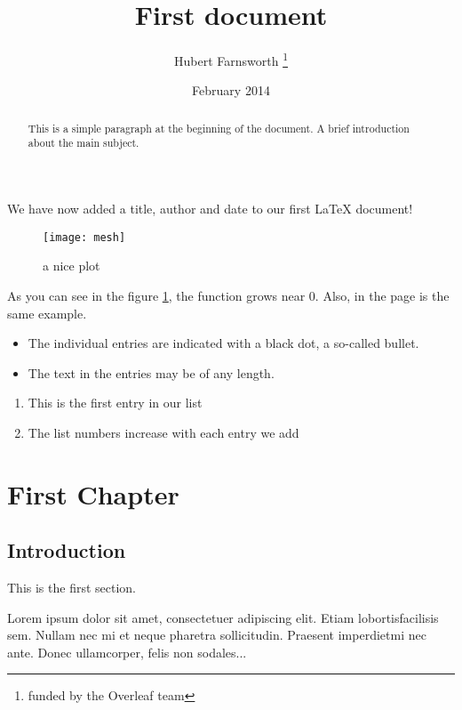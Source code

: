 \documentclass[12pt, a4paper]{article}
\title{First document}  %
\author{Hubert Farnsworth \thanks{funded by the Overleaf team}}  %
\date{February 2014}  %
\begin{document}
\maketitle  %

\tableofcontents  %


We have now added a title, author and date to our first \LaTeX{} document!

\begin{abstract}
This is a simple paragraph at the beginning of the 
document. A brief introduction about the main subject.
\end{abstract}




\begin{figure}[h]
    \centering
    \texttt{[image: mesh]}
    \caption{a nice plot}
    \label{fig:mesh1}
\end{figure}

As you can see in the figure \ref{fig:mesh1}, the 
function grows near 0. Also, in the page \pageref{fig:mesh1} 
is the same example.

\begin{itemize}
  \item The individual entries are indicated with a black dot, a so-called bullet.
  \item The text in the entries may be of any length.
\end{itemize}

\begin{enumerate}
  \item This is the first entry in our list
  \item The list numbers increase with each entry we add
\end{enumerate}




\chapter{First Chapter}

\section{Introduction}

This is the first section.

Lorem  ipsum  dolor  sit  amet,  consectetuer  adipiscing  
elit.   Etiam  lobortisfacilisis sem.  Nullam nec mi et 
neque pharetra sollicitudin.  Praesent imperdietmi nec ante. 
Donec ullamcorper, felis non sodales...
\end{document}

